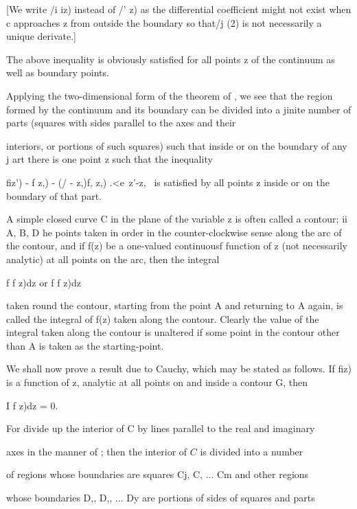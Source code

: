 [We write /i iz) instead of /' z) as the differential coefficient
might not exist when c approaches z from outside the boundary so
that/j (2) is not necessarily a unique derivate.]

The above inequality is obviously satisfied for all points z of the
continuum as well as boundary points.

Applying the two-dimensional form of the theorem of , we see that
the region formed by the continuum and its boundary can be divided
into a jinite number of parts (squares with sides parallel to the axes
and their

%
%

interiors, or portions of such squares) such that inside or on the
boundary of any j art there is one point z such that the inequality

fiz') - f z,) - (/ - z,)f, z,) .<e\ z'-z, \ is satisfied by all points
z inside or on the boundary of that part.


A simple closed curve C in the plane of the variable z is often called
a contour; ii A, B, D he points taken in order in the
counter-clockwise sense along the arc of the contour, and if f(z) be a
one-valued continuousf function of z (not necessarily analytic) at all
points on the arc, then the integral

f f z)dz or f f z)dz

taken round the contour, starting from the point A and returning to A
again, is called the integral of f(z) taken along the contour. Clearly
the value of the integral taken along the contour is unaltered if some
point in the contour other than A is taken as the starting-point.

We shall now prove a result due to Cauchy, which may be stated as
follows. If fiz) is a function of z, analytic at all points on and
inside a contour G, then

I f z)dz = 0.

For divide up the interior of C by lines parallel to the real and
imaginary

axes in the manner of ; then the interior
of $C$ is divided into a number

of regions whose boundaries are squares Cj, C, ... Cm and other
regions

whose boundaries D,, D,, ... Dy are portions of sides of squares and
parts

